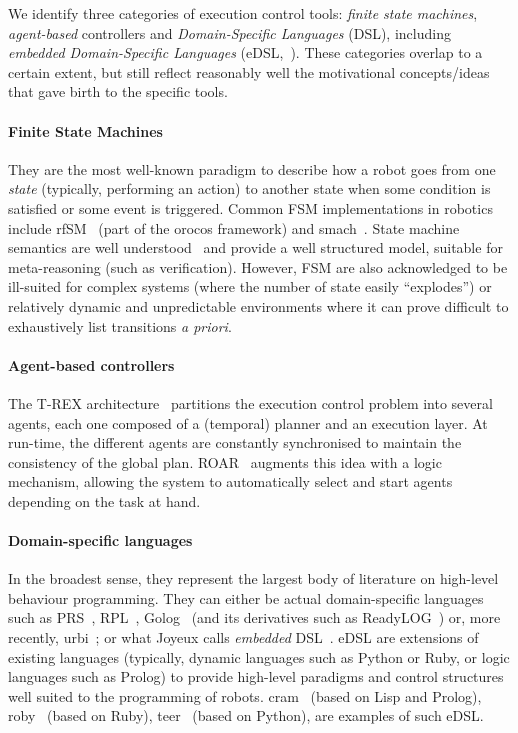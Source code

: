 \documentclass[letterpaper, 10pt, conference]{ieeeconf}      %
\begin{document}
We identify three categories of execution control tools: \emph{finite state
machines}, \emph{agent-based} controllers and
\emph{Domain-Specific Languages} (DSL), including \emph{embedded Domain-Specific
Languages} (eDSL,~\cite{joyeux2011robot}). These categories overlap to a certain
extent, but still reflect reasonably well the motivational concepts/ideas that
gave birth to the specific tools.

\paragraph{Finite State Machines} They are the most well-known paradigm to
describe how a robot goes from one \emph{state} (typically, performing an
action) to another state when some condition is satisfied or some event is
triggered. Common FSM implementations in robotics include {\sc
rfSM}~\cite{klotzbucher2010orocos} (part of the {\sc orocos} framework) and
{\sc smach}~\cite{bohren2010smach}. State machine semantics are well
understood~\cite{harel1996statemate} and provide a well structured model,
suitable for meta-reasoning (such as verification). However, FSM are also
acknowledged to be ill-suited for complex systems (where the number of state
easily ``explodes'') or relatively dynamic and unpredictable environments where
it can prove difficult to exhaustively list transitions \textit{a priori}.


\paragraph{Agent-based controllers}

The T-REX architecture~\cite{mcgann2007trex} partitions the execution control
problem into several agents, each one composed of a (temporal) planner and an
execution layer. At run-time, the different agents are constantly synchronised
to maintain the consistency of the global plan. ROAR~\cite{degroote2011roar}
augments this idea with a logic mechanism, allowing the system to automatically
select and start agents depending on the task at hand.

\paragraph{Domain-specific languages}

In the broadest sense, they represent the largest body of literature on
high-level behaviour programming. They can either be actual domain-specific
languages such as PRS~\cite{ingrand1996prs}, RPL~\cite{mcdermott1993reactive},
Golog~\cite{levesque1997golog} (and its derivatives such as {\sc
ReadyLOG}~\cite{ferrein2007robot}) or, more recently, {\sc
urbi}~\cite{baillie2005urbi}; or what Joyeux calls \emph{embedded}
DSL~\cite{joyeux2011robot}. eDSL are extensions of existing languages (typically, dynamic
languages such as Python or Ruby, or logic languages such as Prolog) to provide
high-level paradigms and control structures well suited to the programming of
robots. {\sc cram}~\cite{beetz2010cram} (based on Lisp and Prolog), {\sc
roby}~\cite{joyeux2009plan} (based on Ruby), {\sc teer}~\cite{magnenat2012teer}
(based on Python), are examples of such eDSL.
\end{document}
